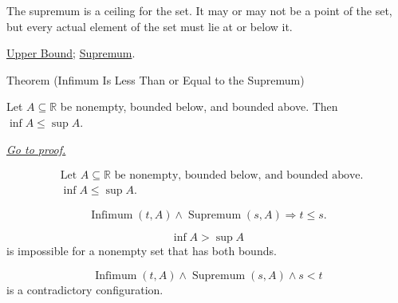 \begin{remark*}[Interpretation]
The supremum is a ceiling for the set. It may or may not be a point of the set, but every actual element of the set must lie at or below it.
\end{remark*}

\begin{remark*}[Dependencies]
\hyperref[def:upper-bound]{Upper Bound};
\hyperref[def:supremum]{Supremum}.
\end{remark*}


\begin{theorembox}{Theorem (Infimum Is Less Than or Equal to the Supremum)}
\begin{theorem}
\label{thm:infimum-less-than-supremum}
Let $A\subseteq\mathbb{R}$ be nonempty, bounded below, and bounded above. Then $\inf A\le \sup A$.

\smallskip
\noindent
\hyperref[prf:infimum-less-than-supremum]{\textit{Go to proof.}}
\end{theorem}
\end{theorembox}

\begin{remark*}
\[
\begin{aligned}
&\text{Let }A\subseteq\mathbb{R}\text{ be nonempty, bounded below, and bounded above.}\\
&\inf A\le \sup A.
\end{aligned}
\]
\end{remark*}

\begin{remark*}
\[
\operatorname{Infimum}(t,A)\land \operatorname{Supremum}(s,A)
\Longrightarrow
t\le s.
\]
\end{remark*}

\begin{remark*}
\[
\inf A>\sup A
\]
is impossible for a nonempty set that has both bounds.
\end{remark*}

\begin{remark*}
\[
\operatorname{Infimum}(t,A)\land \operatorname{Supremum}(s,A)\land s<t
\]
is a contradictory configuration.
\end{remark*}

